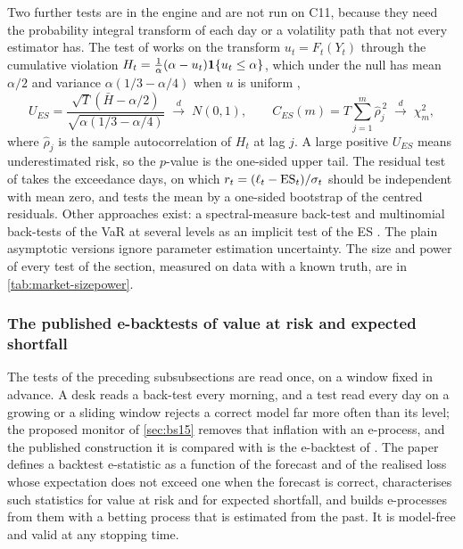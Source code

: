 Two further tests are in the engine and are not run on C11, because they need the probability integral transform of each day or a volatility path
that not every estimator has. The test of \citet{market:duescanciano2017} works on the transform $u_t=F_t(Y_t)$ through the cumulative violation
$H_t=\frac1\alpha(\alpha-u_t)\mathbf{1}\{u_t\le\alpha\}$, which under the null has mean $\alpha/2$ and variance $\alpha(1/3-\alpha/4)$ when $u$ is uniform
\citep{market:huehurlinlu2024},
\begin{equation}
U_{ES}=\frac{\sqrt T\left(\bar H-\alpha/2\right)}{\sqrt{\alpha\left(1/3-\alpha/4\right)}}\;\overset{d}{\longrightarrow}\;N(0,1),\qquad
C_{ES}(m)=T\sum_{j=1}^{m}\widehat\rho_j^{\,2}\;\overset{d}{\longrightarrow}\;\chi^2_m,
\label{eq:mk-de}
\end{equation}
where $\widehat\rho_j$ is the sample autocorrelation of $H_t$ at lag $j$. A large positive $U_{ES}$ means underestimated risk, so the $p$-value is the
one-sided upper tail. The residual test of \citet{market:mcneilfrey2000} takes the exceedance days, on which
$r_t=(\ell_t-\operatorname{ES}_t)/\sigma_t$ should be independent with mean zero, and tests the mean by a one-sided bootstrap of the centred residuals. Other
approaches exist: a spectral-measure back-test \citep{market:costanzinocurran2015} and multinomial back-tests of the VaR at several levels as an implicit
test of the ES \citep{market:kratzlokmcneil2018}. The plain asymptotic versions ignore parameter estimation uncertainty. The size and power of every test
of the section, measured on data with a known truth, are in \cref{tab:market-sizepower}.

\subsubsection{The published e-backtests of value at risk and expected shortfall}
\label{sec:m39}
The tests of the preceding subsubsections are read once, on a window fixed in advance. A desk reads a back-test every morning, and a test read
every day on a growing or a sliding window rejects a correct model far more often than its level; the proposed monitor of \cref{sec:bs15}
removes that inflation with an e-process, and the published construction it is compared with is the e-backtest of \citet{proposed:wang2022}.
The paper defines a backtest e-statistic as a function of the forecast and of the realised loss whose expectation does not exceed one when the
forecast is correct, characterises such statistics for value at risk and for expected shortfall, and builds e-processes from them with a betting
process that is estimated from the past. It is model-free and valid at any stopping time.

